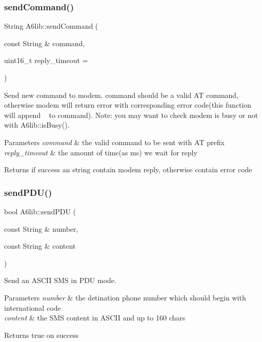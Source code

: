 \subsubsection{\texorpdfstring{send\+Command()}{sendCommand()}}
{\footnotesize\ttfamily String A6lib\+::send\+Command (\begin{DoxyParamCaption}\item[{const String \&}]{command,  }\item[{uint16\+\_\+t}]{reply\+\_\+timeout = {} }\end{DoxyParamCaption})}

Send new command to modem. command should be a valid AT command, otherwise modem will return error with corresponding error code(this function will append ~\newline
 to command). Note\+: you may want to check modem is busy or not with A6lib\+::is\+Busy(). 
\begin{DoxyParams}{Parameters}
{\em command} & the valid command to be sent with AT prefix \\
\hline
{\em reply\+\_\+timeout} & the amount of time(as ms) we wait for reply \\
\hline
\end{DoxyParams}
\begin{DoxyReturn}{Returns}
if success an string contain modem reply, otherwise contain error code 
\end{DoxyReturn}
\mbox{\label{class_a6lib_a0ce431632e4a5e4d26c2d95c83fe7ee5}} 
\subsubsection{\texorpdfstring{send\+P\+D\+U()}{sendPDU()}\hspace{0.1cm}{\footnotesize\ttfamily [1/2]}}
{\footnotesize\ttfamily bool A6lib\+::send\+P\+DU (\begin{DoxyParamCaption}\item[{const String \&}]{number,  }\item[{const String \&}]{content }\end{DoxyParamCaption})}

Send an A\+S\+C\+II S\+MS in P\+DU mode. 
\begin{DoxyParams}{Parameters}
{\em number} & the detination phone number which should begin with international code \\
\hline
{\em content} & the S\+MS content in A\+S\+C\+II and up to 160 chars \\
\hline
\end{DoxyParams}
\begin{DoxyReturn}{Returns}
true on success 
\end{DoxyReturn}
\mbox{\label{class_a6lib_ae7b4dfe629c48b1b36c1409bb4f4720e}} 
